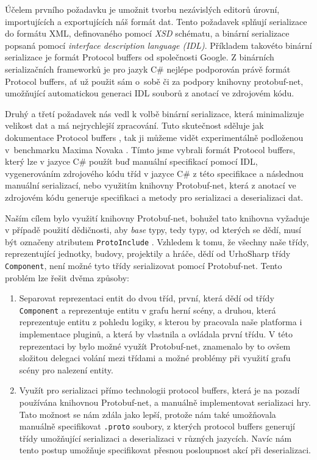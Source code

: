 Účelem prvního požadavku je umožnit tvorbu nezávislých editorů úrovní, importujících a exportujících náš formát dat. Tento požadavek splňují serializace do formátu XML, definovaného pomocí \textit{XSD} schématu, a binární serializace popsaná pomocí \textit{interface description language (IDL)}. Příkladem takovéto binární serializace je formát Protocol buffers \citep{site:protobuf} od společnosti Google. Z binárních serializačních frameworků je pro jazyk C\# nejlépe podporován právě formát Protocol buffers, ať už použit sám o~sobě či za podpory knihovny protobuf-net, umožňující automatickou generaci IDL souborů z anotací ve zdrojovém kódu. 

Druhý a třetí požadavek nás vedl k volbě binární serializace, která minimalizuje velikost dat a má nejrychlejší zpracování. Tuto skutečnost sděluje jak dokumentace Protocol buffers \citep{site:protobufdevguide}, tak ji můžeme vidět experimentálně podloženou v~benchmarku Maxima Novaka \citep{site:serializationspeed}. Tímto jsme vybrali formát Protocol buffers, který lze v jazyce C\# použít buď manuální specifikací \textit{ } pomocí IDL, vygenerováním zdrojového kódu tříd v jazyce C\# z této specifikace a následnou manuální serializací, nebo využitím knihovny Protobuf-net, která z anotací ve zdrojovém kódu generuje specifikaci \textit{ } a  metody pro serializaci a deserializaci dat.

Naším cílem bylo využití knihovny Protobuf-net, bohužel tato knihovna vyžaduje v případě použití dědičnosti, aby \textit{base} typy, tedy typy, od kterých se dědí, musí být označeny atributem \texttt{ProtoInclude} \citep{site:protobufnet}. Vzhledem k tomu, že všechny naše třídy, reprezentující jednotky, budovy, projektily a hráče, dědí od UrhoSharp třídy \texttt{Component}, není možné tyto třídy serializovat pomocí Protobuf-net. Tento problém lze řešit dvěma způsoby: 

\begin{enumerate}
	\item Separovat reprezentaci entit do dvou tříd, první, která dědí od třídy \texttt{Component} a reprezentuje entitu v grafu herní scény, a druhou, která reprezentuje entitu z pohledu logiky, s kterou by pracovala naše platforma i implementace pluginů, a která by vlastnila a ovládala první třídu. V této reprezentaci by bylo možné využít Protobuf-net, znamenalo by to ovšem složitou delegaci volání mezi třídami a možné problémy při využití grafu scény pro nalezení entity. 
	\item Využít pro serializaci přímo technologii protocol buffers, která je na pozadí používána knihovnou Protobuf-net, a manuálně implementovat serializaci hry. Tato možnost se nám zdála jako lepší, protože nám také umožňovala manuálně specifikovat \texttt{.proto} soubory, z kterých protocol buffers generují třídy umožňující serializaci a deserializaci v různých jazycích. Navíc nám tento postup umožňuje specifikovat přesnou posloupnost akcí při deserializaci.
\end{enumerate}

